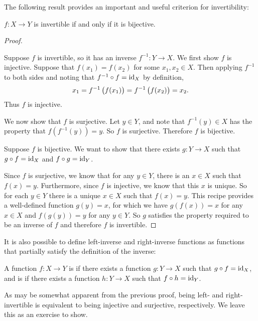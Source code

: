 The following result provides an important and useful criterion for invertibility:

\begin{lemma}
$f:X \to Y$ is invertible if and only if it is bijective.
\end{lemma}

\begin{proof} \

\fbox{$\implies$} Suppose $f$ is invertible, so it has an inverse $f^{-1}: Y \to X$. We first show $f$ is injective. Suppose that $f(x_1) = f(x_2)$ for some $x_1, x_2 \in X$. Then applying $f^{-1}$ to both sides and noting that $f^{-1}\circ f=\operatorname{id}_X$ by definition,
\[x_1=f^{-1}\left(f(x_1)\right)=f^{-1}\left(f(x_2)\right)=x_2.\]
Thus $f$ is injective.

We now show that $f$ is surjective. Let $y \in Y$, and note that $f^{-1}(y) \in X$ has the property that $f(f^{-1}(y)) = y$. So $f$ is surjective. Therefore $f$ is bijective.

\fbox{$\impliedby$} Suppose $f$ is bijective. We want to show that there exists $g:Y \to X$ such that $g \circ f = \operatorname{id}_X$ and $f \circ g = \operatorname{id}_Y$.

Since $f$ is surjective, we know that for any $y \in Y$, there is an $x \in X$ such that $f(x) = y$. Furthermore, since $f$ is injective, we know that this $x$ is unique. So for each $y \in Y$ there is a unique $x \in X$ such that $f(x) = y$. This recipe provides a well-defined function $g(y) = x$, for which we have $g(f(x)) = x$ for any $x \in X$ and $f(g(y)) = y$ for any $y \in Y$. So $g$ satisfies the property required to be an inverse of $f$ and therefore $f$ is invertible.
\end{proof}

It is also possible to define left-inverse and right-inverse functions as functions that partially satisfy the definition of the inverse:

\begin{definition}
A function $f:X \to Y$ is  if there exists a function $g:Y \to X$ such that $g \circ f = \operatorname{id}_X$, and is  if there exists a function $h: Y \to X$ such that $f \circ h = \operatorname{id}_Y$.
\end{definition}

As may be somewhat apparent from the previous proof, being left- and right-invertible is equivalent to being injective and surjective, respectively. We leave this as an exercise to show.

